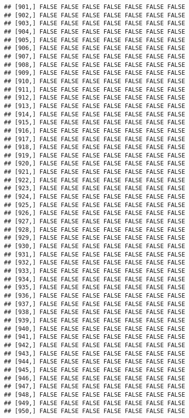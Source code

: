 \documentclass[
]{article}
\begin{document}
\begin{verbatim}
## [901,] FALSE FALSE FALSE FALSE FALSE FALSE FALSE
## [902,] FALSE FALSE FALSE FALSE FALSE FALSE FALSE
## [903,] FALSE FALSE FALSE FALSE FALSE FALSE FALSE
## [904,] FALSE FALSE FALSE FALSE FALSE FALSE FALSE
## [905,] FALSE FALSE FALSE FALSE FALSE FALSE FALSE
## [906,] FALSE FALSE FALSE FALSE FALSE FALSE FALSE
## [907,] FALSE FALSE FALSE FALSE FALSE FALSE FALSE
## [908,] FALSE FALSE FALSE FALSE FALSE FALSE FALSE
## [909,] FALSE FALSE FALSE FALSE FALSE FALSE FALSE
## [910,] FALSE FALSE FALSE FALSE FALSE FALSE FALSE
## [911,] FALSE FALSE FALSE FALSE FALSE FALSE FALSE
## [912,] FALSE FALSE FALSE FALSE FALSE FALSE FALSE
## [913,] FALSE FALSE FALSE FALSE FALSE FALSE FALSE
## [914,] FALSE FALSE FALSE FALSE FALSE FALSE FALSE
## [915,] FALSE FALSE FALSE FALSE FALSE FALSE FALSE
## [916,] FALSE FALSE FALSE FALSE FALSE FALSE FALSE
## [917,] FALSE FALSE FALSE FALSE FALSE FALSE FALSE
## [918,] FALSE FALSE FALSE FALSE FALSE FALSE FALSE
## [919,] FALSE FALSE FALSE FALSE FALSE FALSE FALSE
## [920,] FALSE FALSE FALSE FALSE FALSE FALSE FALSE
## [921,] FALSE FALSE FALSE FALSE FALSE FALSE FALSE
## [922,] FALSE FALSE FALSE FALSE FALSE FALSE FALSE
## [923,] FALSE FALSE FALSE FALSE FALSE FALSE FALSE
## [924,] FALSE FALSE FALSE FALSE FALSE FALSE FALSE
## [925,] FALSE FALSE FALSE FALSE FALSE FALSE FALSE
## [926,] FALSE FALSE FALSE FALSE FALSE FALSE FALSE
## [927,] FALSE FALSE FALSE FALSE FALSE FALSE FALSE
## [928,] FALSE FALSE FALSE FALSE FALSE FALSE FALSE
## [929,] FALSE FALSE FALSE FALSE FALSE FALSE FALSE
## [930,] FALSE FALSE FALSE FALSE FALSE FALSE FALSE
## [931,] FALSE FALSE FALSE FALSE FALSE FALSE FALSE
## [932,] FALSE FALSE FALSE FALSE FALSE FALSE FALSE
## [933,] FALSE FALSE FALSE FALSE FALSE FALSE FALSE
## [934,] FALSE FALSE FALSE FALSE FALSE FALSE FALSE
## [935,] FALSE FALSE FALSE FALSE FALSE FALSE FALSE
## [936,] FALSE FALSE FALSE FALSE FALSE FALSE FALSE
## [937,] FALSE FALSE FALSE FALSE FALSE FALSE FALSE
## [938,] FALSE FALSE FALSE FALSE FALSE FALSE FALSE
## [939,] FALSE FALSE FALSE FALSE FALSE FALSE FALSE
## [940,] FALSE FALSE FALSE FALSE FALSE FALSE FALSE
## [941,] FALSE FALSE FALSE FALSE FALSE FALSE FALSE
## [942,] FALSE FALSE FALSE FALSE FALSE FALSE FALSE
## [943,] FALSE FALSE FALSE FALSE FALSE FALSE FALSE
## [944,] FALSE FALSE FALSE FALSE FALSE FALSE FALSE
## [945,] FALSE FALSE FALSE FALSE FALSE FALSE FALSE
## [946,] FALSE FALSE FALSE FALSE FALSE FALSE FALSE
## [947,] FALSE FALSE FALSE FALSE FALSE FALSE FALSE
## [948,] FALSE FALSE FALSE FALSE FALSE FALSE FALSE
## [949,] FALSE FALSE FALSE FALSE FALSE FALSE FALSE
## [950,] FALSE FALSE FALSE FALSE FALSE FALSE FALSE

\end{verbatim}
\end{document}
